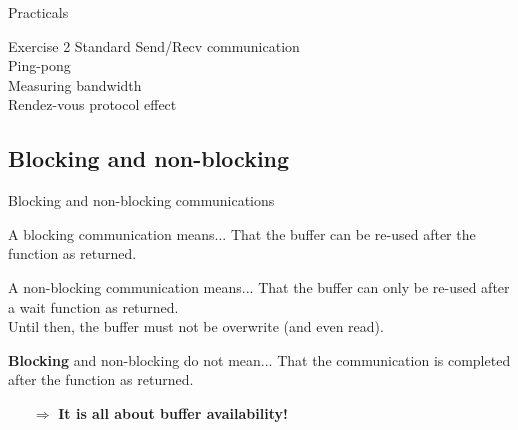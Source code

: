 \documentclass[aspectratio=43]{beamer}
\begin{document}
\begin{frame}{Practicals}
    \begin{brown2block}{Exercise 2}
        Standard Send/Recv communication\\
        Ping-pong\\
        Measuring bandwidth\\
        Rendez-vous protocol effect
    \end{brown2block}
\end{frame}

\subsection{Blocking and non-blocking}
\begin{frame}{Blocking and non-blocking communications}
\begin{green1block}{A blocking communication means...}
    That the buffer can be re-used after the function as returned.
\end{green1block}
\begin{green1block}{A non-blocking communication means...}
    That the buffer can only be re-used after a wait function as returned.\\
    Until then, the buffer must not be overwrite (and even read).
\end{green1block}
\begin{red1block}{\textbf{Blocking} and non-blocking do not mean...}
    That the communication is completed after the function as returned.
\end{red1block}
\begin{itemize}
    \item[\color{cscsred}$\Rightarrow$]\color{cscsred}\textbf{It is all about buffer availability!}
\end{itemize}
\end{frame}
\end{document}
